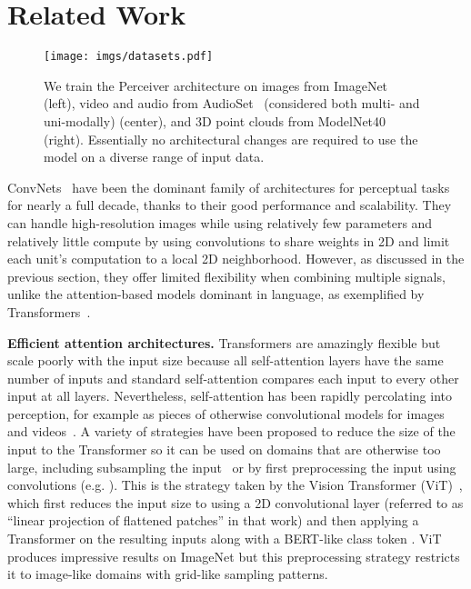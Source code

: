 \documentclass{article}
\begin{document}
\section{Related Work}
\label{sec:related}

\begin{figure*}[t]
\centering
\texttt{[image: imgs/datasets.pdf]}
\vspace{-12pt}
\caption{We train the Perceiver architecture on images from ImageNet~\cite{deng2009imagenet} (left), video and audio from AudioSet~\cite{gemmeke2017audio} (considered both multi- and uni-modally) (center), and 3D point clouds from ModelNet40~\cite{wu20153d} (right). Essentially no architectural changes are required to use the model on a diverse range of input data.}
\label{fig:modalities}
\vspace{-8pt}
\end{figure*}

ConvNets~\cite{fukushima1980selforganizing, lecun1998gradient, ciresan2011highperformance, krizhevsky2012imagenet} have been the dominant family of architectures for perceptual tasks for nearly a full decade, thanks to their good performance and scalability. They can handle high-resolution images while using relatively few parameters and relatively little compute by using convolutions to share weights in 2D and limit each unit's computation to a local 2D neighborhood. However, as discussed in the previous section, they offer limited flexibility when combining multiple signals, unlike the attention-based models dominant in language, as exemplified by Transformers~\cite{vaswani2017attention}.

\noindent \textbf{Efficient attention architectures.}  Transformers are amazingly flexible but scale poorly with the input size because all self-attention layers have the same number of inputs and standard self-attention compares each input to every other input at all layers. Nevertheless, self-attention has been rapidly percolating into perception, for example as pieces of otherwise convolutional models for images~\cite{bello2019attention,cordonnier2019relationship, srinivas2021bottleneck} and videos~\cite{wang2018non,girdhar2019video}. A variety of strategies have been proposed to reduce the size of the input to the Transformer so it can be used on domains that are otherwise too large, including subsampling the input~\cite{chen2020generative} or by first preprocessing the input using convolutions (e.g. \citealt{wu2020visual}). This is the strategy taken by the Vision Transformer (ViT)~\cite{dosovitskiy2020image}, which first reduces the input size to  using a 2D convolutional layer (referred to as ``linear projection of flattened patches'' in that work) and then applying a Transformer on the resulting inputs along with a BERT-like class token \cite{devlin2018bert}. ViT produces impressive results on ImageNet but this preprocessing strategy restricts it to image-like domains with grid-like sampling patterns. 
\end{document}
